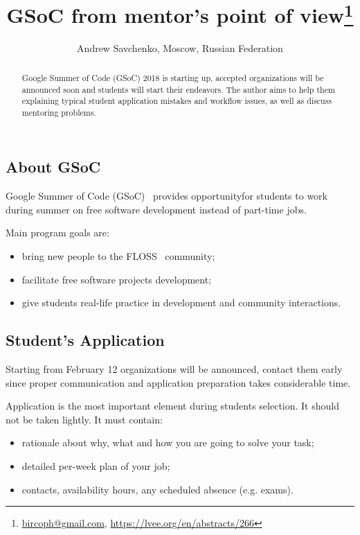 \documentclass[10pt, a5paper]{article}
\begin{document}
\title{GSoC from mentor's point of view\footnote{\url{bircoph@gmail.com}, \url{https://lvee.org/en/abstracts/266}}}
\author{Andrew Savchenko, Moscow, Russian Federation}
\maketitle
\begin{abstract}
Google Summer of Code (GSoC) 2018 is starting up, accepted organizations will be announced soon and students will start their endeavors. The author aims to help them explaining typical student application mistakes and workflow issues, as well as discuss mentoring problems.
\end{abstract}
\subsection*{About GSoC}

Google Summer of Code (GSoC)~\cite{Savchenko-1} provides opportunity\linebreak for students to work during summer on free software development instead of part-time jobs.

Main program goals are:

\begin{itemize}
  \item bring new people to the FLOSS~\cite{Savchenko-2} community;
  \item facilitate free software projects development;
  \item give students real-life practice in development and community interactions.
\end{itemize}

\subsection*{Student's Application}

Starting from February 12 organizations will be announced, contact them early since proper communication and application preparation takes considerable time. 

Application is the most important element during students selection. It should not be taken lightly. It must contain:

\begin{itemize}
  \item rationale about why, what and how you are going to solve your task;
  \item detailed per-week plan of your job;
  \item contacts, availability hours, any scheduled absence (e.g. exams).
\end{itemize}
\end{document}
